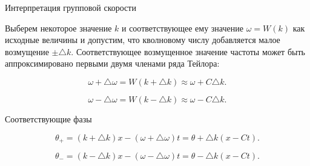 \documentclass[10pt,xcolor=pst,aspectratio=169]{beamer}
\begin{document}
\begin{frame}{Интерпретация групповой скорости}

	\transdissolve[duration=0.1]
	\justifying
	\large

    Выберем некоторое значение $k$ и соответствующее ему значение $\omega = W \left( k \right)$ как исходные величины и допустим, что кволновому числу добавляется малое возмущение $\pm \triangle k$. Соответствующее возмущенное значение частоты может быть аппроксимировано первыми двумя членами ряда Тейлора:

    \[
        \omega + \triangle \omega = W \left( k + \triangle k \right) \approx \omega + C \triangle k .
    \]

    \[
        \omega - \triangle \omega = W \left( k - \triangle k \right) \approx \omega - C \triangle k .
    \]

    Соответствующие фазы

    \[
        \theta_{+} = \left( k + \triangle k \right) x - \left( \omega + \triangle \omega \right) t = \theta + \triangle k \left( x - C t \right) .
    \]

    \[
        \theta_{-} = \left( k - \triangle k \right) x - \left( \omega - \triangle \omega \right) t = \theta - \triangle k \left( x - C t \right) .
    \]

\end{frame}
\end{document}
